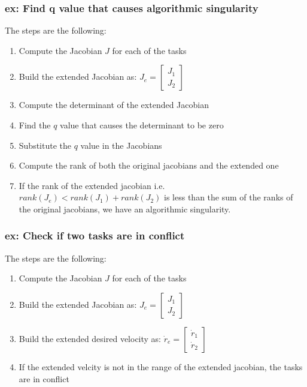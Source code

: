 \documentclass[a4paper,12pt]{article}
\begin{document}
    \subsubsection{ex: Find q value that causes algorithmic singularity}
The steps are the following:
\begin{enumerate}
    \item Compute the Jacobian $J$ for each of the tasks
    \item Build the extended Jacobian as: $J_e = \begin{bmatrix}
        J_1 \\
        J_2
    \end{bmatrix}$
    \item Compute the determinant of the extended Jacobian
    \item Find the $q$ value that causes the determinant to be zero
    \item Substitute the $q$ value in the Jacobians
    \item Compute the rank of both the original jacobians and the extended one
    \item If the rank of the extended jacobian i.e. $rank(J_e) < rank(J_1) + rank(J_2)$
    is less than the sum of the ranks of 
    the original jacobians, we have an algorithmic singularity.
\end{enumerate}

\subsubsection{ex: Check if two tasks are in conflict}
The steps are the following:
\begin{enumerate}
    \item Compute the Jacobian $J$ for each of the tasks
    \item Build the extended Jacobian as: $J_e = \begin{bmatrix}
        J_1 \\
        J_2
    \end{bmatrix}$
    \item Build the extended desired velocity as: $\dot{r}_e = \begin{bmatrix}
        \dot{r}_1 \\
        \dot{r}_2
    \end{bmatrix}$
    \item If the extended velcity is not in the range of 
    the extended jacobian, the tasks are in conflict
\end{enumerate}
\end{document}
